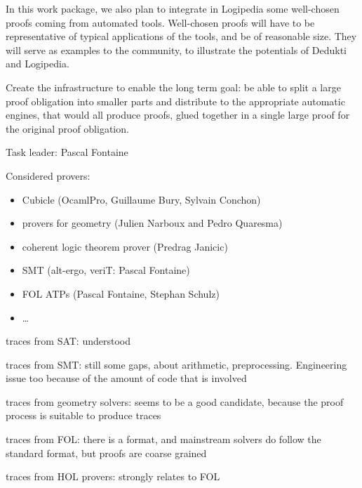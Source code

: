\begin{workpackage}[id=atpetc,wphases=0-48,type=RTD,
  short=ATPs etc.,%
  title={ATP, SAT, SMT, Model checkers},
  lead=Lie,
  LieRM=10]
\begin{wpdescription}
In this work package, we also plan to integrate in Logipedia some
well-chosen proofs coming from automated tools.  Well-chosen proofs
will have to be representative of typical applications of the tools,
and be of reasonable size.  They will serve as examples to the
community, to illustrate the potentials of Dedukti and Logipedia.


Create the infrastructure to enable the long term goal: be able to split a large proof
obligation into smaller parts and distribute to the appropriate automatic engines, that
would all produce proofs, glued together in a single large proof for the original proof
obligation.
\end{wpdescription}


\begin{tasklist}
\begin{task}[id=instrumenting, title=Instrumenting ATPs to produce
  traces]
  Task leader: Pascal Fontaine
  
Considered provers:
\begin{itemize}
\item Cubicle (OcamlPro, Guillaume Bury, Sylvain Conchon)
\item provers for geometry (Julien Narboux and Pedro Quaresma)
\item coherent logic theorem prover (Predrag Janicic)
\item SMT (alt-ergo, veriT: Pascal Fontaine)
\item FOL ATPs (Pascal Fontaine, Stephan Schulz)
\item \dots
\end{itemize}

traces from SAT: understood

traces from SMT: still some gaps, about arithmetic, preprocessing.  Engineering issue too because of the amount of code that is involved

traces from geometry solvers: seems to be a good candidate, because the proof process is suitable to produce traces

traces from FOL: there is a format, and mainstream solvers do follow the standard format, but proofs are coarse grained

traces from HOL provers: strongly relates to FOL


\end{task}
\end{tasklist}
\end{workpackage}
